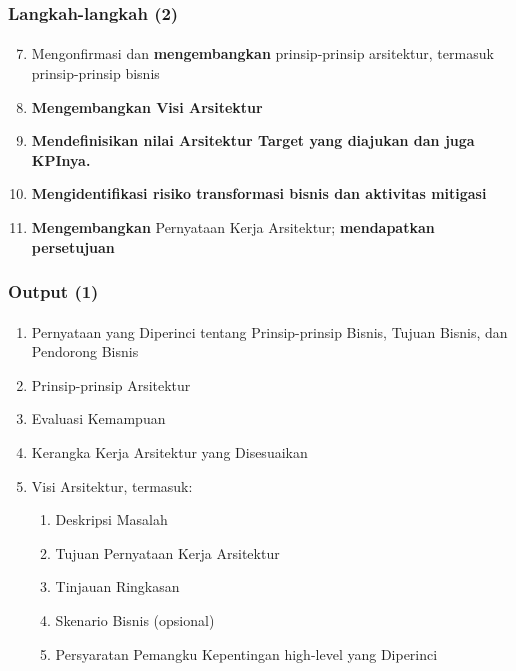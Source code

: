 \documentclass[aspectratio=169, table]{beamer}
\begin{document}
		\begin{frame}
		\frametitle{Langkah-langkah (2)}
		\framesubtitle{\hspace{1cm}}
		\begin{enumerate}
			\setcounter{enumi}{6}
			\item Mengonfirmasi dan \textbf{mengembangkan} prinsip-prinsip arsitektur, termasuk prinsip-prinsip bisnis
			\item \textbf{Mengembangkan Visi Arsitektur}
			\item \textbf{Mendefinisikan nilai Arsitektur Target yang diajukan dan juga KPInya.} 
			\item \textbf{Mengidentifikasi risiko transformasi bisnis dan aktivitas mitigasi}
			\item \textbf{Mengembangkan} Pernyataan Kerja Arsitektur; \textbf{mendapatkan persetujuan}
			
			
		\end{enumerate}
	\end{frame}
	
	
	\begin{frame}
		\frametitle{Output (1)}
		\framesubtitle{\hspace{1cm}}
		\begin{enumerate}
		
			\item Pernyataan yang Diperinci tentang Prinsip-prinsip Bisnis, Tujuan Bisnis, dan Pendorong Bisnis
			\item Prinsip-prinsip Arsitektur
			\item Evaluasi Kemampuan
			\item Kerangka Kerja Arsitektur yang Disesuaikan
			\item Visi Arsitektur, termasuk:
			\begin{enumerate}
				\item Deskripsi Masalah
				\item Tujuan Pernyataan Kerja Arsitektur
				\item Tinjauan Ringkasan
				\item Skenario Bisnis (opsional)
				\item Persyaratan Pemangku Kepentingan high-level yang Diperinci
			\end{enumerate}
		\end{enumerate}
	\end{frame}
	
\end{document}
